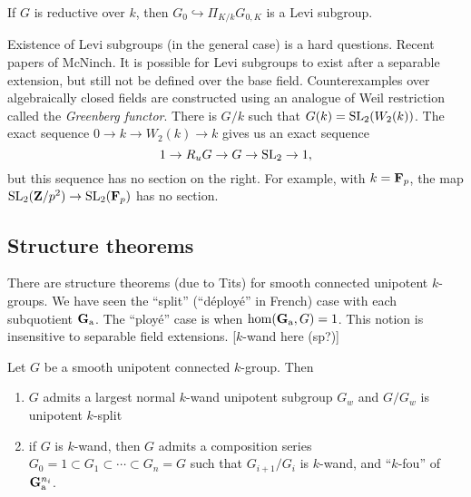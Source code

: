 \documentclass{article}
\begin{document}
\begin{exercise}
If $G$ is reductive over $k$, then $G_0\hookrightarrow \Pi_{K/k} G_{0,K}$ is a 
Levi subgroup. 
\end{exercise}


Existence of Levi subgroups (in the general case) is a hard questions. Recent 
papers of McNinch. It is possible for Levi subgroups to exist after a 
separable extension, but still not be defined over the base field. Counterexamples 
over algebraically closed fields are constructed using an analogue of Weil 
restriction called the \emph{Greenberg functor}. There is $G/k$ such that 
$G(k)=\operatorname{SL}_2(W_2(k))$. The exact sequence 
$0 \to k \to W_2(k) \to k$ gives us an exact sequence 
\[
  1 \to R_u G \to G \to \operatorname{SL}_2 \to 1 ,
\]
but this sequence has no section on the right. For example, with 
$k=\mathbf{F}_p$, the map $\operatorname{SL}_2(\mathbf{Z}/p^2) \to \operatorname{SL}_2(\mathbf{F}_p)$ has 
no section. 

\subsection{Structure theorems}

There are structure theorems (due to Tits) for smooth connected unipotent 
$k$-groups. We have seen the ``split'' (``d\'eploy\'e'' in French) case with 
each subquotient $\mathbf{G}_{\mathrm{a}}$. The ``ploy\'e'' case is when 
$\hom(\mathbf{G}_{\mathrm{a}},G)=1$. This notion is insensitive to separable field 
extensions. [$k$-wand here (sp?)]

\begin{theorem}[Tits]
Let $G$ be a smooth unipotent connected $k$-group. Then 
\begin{enumerate}
  \item $G$ admits a largest normal $k$-wand unipotent subgroup $G_w$ 
    and $G/G_w$ is unipotent $k$-split
  \item if $G$ is $k$-wand, then $G$ admits a composition series 
    $G_0=1\subset G_1\subset \cdots \subset G_n=G$ such that 
      $G_{i+1}/G_i$ is $k$-wand, and ``$k$-fou'' of $\mathbf{G}_{\mathrm{a}}^{n_i}$. 
\end{enumerate}
\end{theorem}







\end{document}
